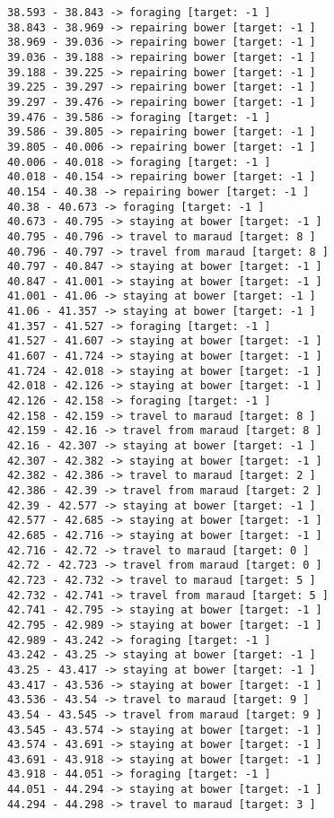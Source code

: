 \documentclass[11pt]{article}
\begin{document}
\begin{Verbatim}[commandchars=\\\{\}]
38.593 - 38.843 -> foraging [target: -1 ]
38.843 - 38.969 -> repairing bower [target: -1 ]
38.969 - 39.036 -> repairing bower [target: -1 ]
39.036 - 39.188 -> repairing bower [target: -1 ]
39.188 - 39.225 -> repairing bower [target: -1 ]
39.225 - 39.297 -> repairing bower [target: -1 ]
39.297 - 39.476 -> repairing bower [target: -1 ]
39.476 - 39.586 -> foraging [target: -1 ]
39.586 - 39.805 -> repairing bower [target: -1 ]
39.805 - 40.006 -> repairing bower [target: -1 ]
40.006 - 40.018 -> foraging [target: -1 ]
40.018 - 40.154 -> repairing bower [target: -1 ]
40.154 - 40.38 -> repairing bower [target: -1 ]
40.38 - 40.673 -> foraging [target: -1 ]
40.673 - 40.795 -> staying at bower [target: -1 ]
40.795 - 40.796 -> travel to maraud [target: 8 ]
40.796 - 40.797 -> travel from maraud [target: 8 ]
40.797 - 40.847 -> staying at bower [target: -1 ]
40.847 - 41.001 -> staying at bower [target: -1 ]
41.001 - 41.06 -> staying at bower [target: -1 ]
41.06 - 41.357 -> staying at bower [target: -1 ]
41.357 - 41.527 -> foraging [target: -1 ]
41.527 - 41.607 -> staying at bower [target: -1 ]
41.607 - 41.724 -> staying at bower [target: -1 ]
41.724 - 42.018 -> staying at bower [target: -1 ]
42.018 - 42.126 -> staying at bower [target: -1 ]
42.126 - 42.158 -> foraging [target: -1 ]
42.158 - 42.159 -> travel to maraud [target: 8 ]
42.159 - 42.16 -> travel from maraud [target: 8 ]
42.16 - 42.307 -> staying at bower [target: -1 ]
42.307 - 42.382 -> staying at bower [target: -1 ]
42.382 - 42.386 -> travel to maraud [target: 2 ]
42.386 - 42.39 -> travel from maraud [target: 2 ]
42.39 - 42.577 -> staying at bower [target: -1 ]
42.577 - 42.685 -> staying at bower [target: -1 ]
42.685 - 42.716 -> staying at bower [target: -1 ]
42.716 - 42.72 -> travel to maraud [target: 0 ]
42.72 - 42.723 -> travel from maraud [target: 0 ]
42.723 - 42.732 -> travel to maraud [target: 5 ]
42.732 - 42.741 -> travel from maraud [target: 5 ]
42.741 - 42.795 -> staying at bower [target: -1 ]
42.795 - 42.989 -> staying at bower [target: -1 ]
42.989 - 43.242 -> foraging [target: -1 ]
43.242 - 43.25 -> staying at bower [target: -1 ]
43.25 - 43.417 -> staying at bower [target: -1 ]
43.417 - 43.536 -> staying at bower [target: -1 ]
43.536 - 43.54 -> travel to maraud [target: 9 ]
43.54 - 43.545 -> travel from maraud [target: 9 ]
43.545 - 43.574 -> staying at bower [target: -1 ]
43.574 - 43.691 -> staying at bower [target: -1 ]
43.691 - 43.918 -> staying at bower [target: -1 ]
43.918 - 44.051 -> foraging [target: -1 ]
44.051 - 44.294 -> staying at bower [target: -1 ]
44.294 - 44.298 -> travel to maraud [target: 3 ]

\end{Verbatim}
\end{document}
